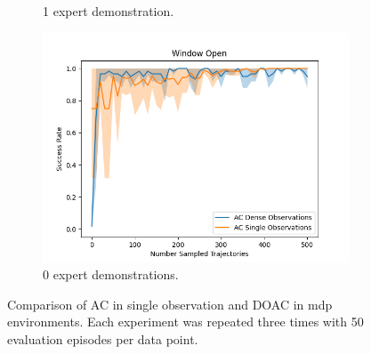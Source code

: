 \begin{figure}[htbp]
\begin{subfigure}[t]{0.32\textwidth}
    \caption{1 expert demonstration.}
  \end{subfigure}
  \hfill
  \begin{subfigure}[t]{0.32\textwidth}
    \includegraphics[width=\textwidth]{images/dense_vs_sparse_0/Window Open.png}
    \caption{0 expert demonstrations.}
  \end{subfigure}
  \caption{Comparison of AC in single observation and DOAC in mdp environments. Each experiment was repeated three times with 50 evaluation episodes per data point.
  }
  \label{fig:dense_vs_single}
\end{figure}